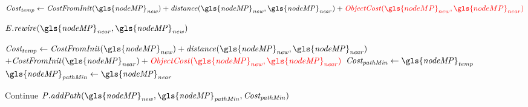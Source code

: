 \begin{algorithm}[H]
\begin{algorithmic}[1]
      \State $\mathit{Cost_{temp}} \leftarrow \mathit{CostFromInit(\gls{nodeMP}_{new})} + \mathit{distance(\gls{nodeMP}_{new}, \gls{nodeMP}_{near})} +\textcolor{red}{\mathit{ObjectCost}(\gls{nodeMP}_{new}, \gls{nodeMP}_{near})}$

      \State $\mathit{E.rewire(\gls{nodeMP}_{near}, \gls{nodeMP}_{new})}$
      \EndIf
      \Else {}

      \State $\mathit{Cost_{temp} \leftarrow CostFromInit(\gls{nodeMP}_{new}) + distance(\gls{nodeMP}_{new}, \gls{nodeMP}_{near})} $ \newline\hspace*{10em} $+ \mathit{CostFromInit(\gls{nodeMP}_{near}) + \textcolor{red}{ObjectCost(\gls{nodeMP}_{new}, \gls{nodeMP}_{near})}}$
      \State $\mathit{Cost_{pathMin} \leftarrow \gls{nodeMP}_{temp}}$
      \State $\mathit{\gls{nodeMP}_{pathMin} \leftarrow \gls{nodeMP}_{near}}$
      \EndIf
      \EndIf

      \State Continue
      \Else
      \State $\mathit{P.addPath(\gls{nodeMP}_{new}, \gls{nodeMP}_{pathMin}, Cost_{pathMin})}$
      \EndIf

      \EndFor

    \EndWhile
  \end{algorithmic}
\end{algorithm}

